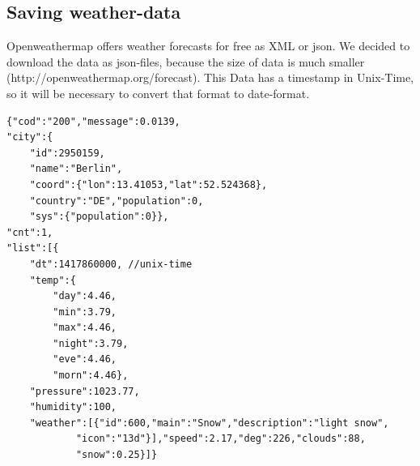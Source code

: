 \documentclass[paper=a4, fontsize=11pt]{article} %
\numberwithin{equation}{section} %
\numberwithin{figure}{section} %
\numberwithin{table}{section} %
\begin{document}
\newpage
\subsection{Saving weather-data}
Openweathermap offers weather forecasts for free as XML or json. We decided to download the data as json-files, because the size of data is much smaller (http://openweathermap.org/forecast). This Data has a timestamp in Unix-Time, so it will be necessary to convert that format to date-format. 
\begin{lstlisting}
{"cod":"200","message":0.0139,
"city":{
	"id":2950159,
    "name":"Berlin",
	"coord":{"lon":13.41053,"lat":52.524368},
	"country":"DE","population":0,
	"sys":{"population":0}},
"cnt":1,
"list":[{
	"dt":1417860000, //unix-time
	"temp":{
		"day":4.46,
		"min":3.79,
		"max":4.46,
		"night":3.79,
		"eve":4.46,
		"morn":4.46},
	"pressure":1023.77,
	"humidity":100,
	"weather":[{"id":600,"main":"Snow","description":"light snow",
    		"icon":"13d"}],"speed":2.17,"deg":226,"clouds":88,
   	 		"snow":0.25}]}
\end{lstlisting}
\end{document}
